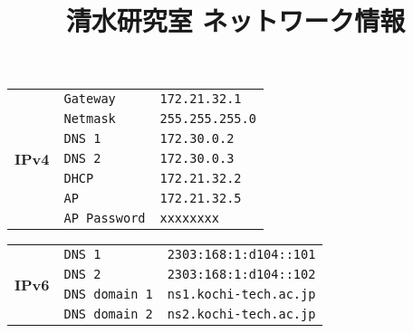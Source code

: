 \documentclass[paper=a4,12pt]{jlreq}
\title{\vspace{-2cm}清水研究室 ネットワーク情報}
\author{}
\date{}
\begin{document}
\maketitle
\begin{tcolorbox}[%
        enhanced,
        colframe = green!20!gray,
        colback = green!10,
        title = {\Large Network},
        fonttitle = \bfseries,
        coltitle = black,
        breakable = true,
        attach boxed title to top left = {xshift = 3mm, yshift = -3mm},
        boxed title style = {colframe = green!20!gray, colback = green!10},
        top = 4mm
    ]
    {\Large
        \begin{tabular}{cp{4cm}p{10cm}}
            \multirow{7}{*}{\textbf{\ttfamily IPv4}} & \verb|Gateway|     & \verb|172.21.32.1|   \\
                                                     & \verb|Netmask|     & \verb|255.255.255.0| \\
                                                     & \verb|DNS 1|       & \verb|172.30.0.2|    \\
                                                     & \verb|DNS 2|       & \verb|172.30.0.3|    \\
                                                     & \verb|DHCP|        & \verb|172.21.32.2|   \\
                                                     & \verb|AP|          & \verb|172.21.32.5|   \\
                                                     & \verb|AP Password| & \verb|xxxxxxxx|
        \end{tabular}
    }
    \tcblower
    {\Large

        \begin{tabular}{cp{4cm}p{10cm}}
            \multirow{4}{*}{\textbf{\ttfamily IPv6}} & \verb|DNS 1|        & \verb|2303:168:1:d104::101| \\
                                                     & \verb|DNS 2|        & \verb|2303:168:1:d104::102| \\
                                                     & \verb|DNS domain 1| & \verb|ns1.kochi-tech.ac.jp| \\
                                                     & \verb|DNS domain 2| & \verb|ns2.kochi-tech.ac.jp| \\
        \end{tabular}
    }
\end{tcolorbox}
\end{document}
